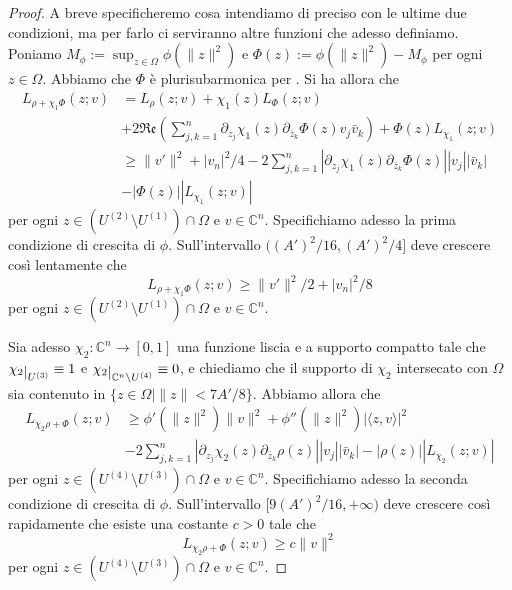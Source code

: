 \begin{proof}
    A breve specificheremo cosa intendiamo di preciso con le ultime due condizioni, ma per farlo ci serviranno altre funzioni che adesso definiamo. Poniamo $M_\phi:=\displaystyle\sup_{z\in\Omega}\phi(\|z\|^2)$ e $\Phi(z):=\phi(\|z\|^2)-M_\phi$ per ogni $z\in\Omega$. Abbiamo che $\Phi$ è plurisubarmonica per \cite[Proposition 2.2.6]{Kr}. Si ha allora che
    \begin{align*}
        L_{\rho+\chi_1\Phi}(z;v)&=L_\rho(z;v)+\chi_1(z)L_\Phi(z;v)\\
        &+2\mathfrak{Re}\left(\sum_{j,k=1}^n\partial_{z_j}\chi_1(z)\partial_{\bar{z}_k}\Phi(z)v_j\bar{v}_k\right)+\Phi(z)L_{\chi_1}(z;v)\\
        &\ge \|v'\|^2+|v_n|^2/4-2\sum_{j,k=1}^n|\partial_{z_j}\chi_1(z)\partial_{\bar{z}_k}\Phi(z)||v_j||\bar{v}_k|\\
        &-|\Phi(z)||L_{\chi_1}(z;v)|
    \end{align*}
    per ogni $z\in(U^{(2)}\setminus U^{(1)})\cap\Omega$ e $v\in\mathbb{C}^n$. Specifichiamo adesso la prima condizione di crescita di $\phi$. Sull'intervallo $((A')^2/16,(A')^2/4]$ deve crescere così lentamente che
    $$L_{\rho+\chi_1\Phi}(z;v)\ge \|v'\|^2/2+|v_n|^2/8$$
    per ogni $z\in(U^{(2)}\setminus U^{(1)})\cap\Omega$ e $v\in\mathbb{C}^n$.

    Sia adesso $\chi_2:\mathbb{C}^n\longrightarrow[0,1]$ una funzione liscia e a supporto compatto tale che $\chi_2\restrict{U^{(3)}}\equiv1$ e $\chi_2\restrict{\mathbb{C}^n\setminus{U^{(4)}}}\equiv 0$, e chiediamo che il supporto di $\chi_2$ intersecato con $\Omega$ sia contenuto in $\{z\in\Omega\mid \|z\|<7A'/8\}$. Abbiamo allora che
    \begin{align*}
        L_{\chi_2\rho+\Phi}(z;v)&\ge \phi'(\|z\|^2)\|v\|^2+\phi''(\|z\|^2)|\langle z,v\rangle|^2\\
        &-2\sum_{j,k=1}^n|\partial_{z_j}\chi_2(z)\partial_{\bar{z}_k}\rho(z)||v_j||\bar{v}_k|-|\rho(z)||L_{\chi_2}(z;v)|
    \end{align*}
    per ogni $z\in(U^{(4)}\setminus U^{(3)})\cap\Omega$ e $v\in\mathbb{C}^n$. Specifichiamo adesso la seconda condizione di crescita di $\phi$. Sull'intervallo $[9(A')^2/16,+\infty)$ deve crescere così rapidamente che esiste una costante $c>0$ tale che
    $$L_{\chi_2\rho+\Phi}(z;v)\ge c\|v\|^2$$
    per ogni $z\in(U^{(4)}\setminus U^{(3)})\cap\Omega$ e $v\in\mathbb{C}^n$.


\end{proof}
